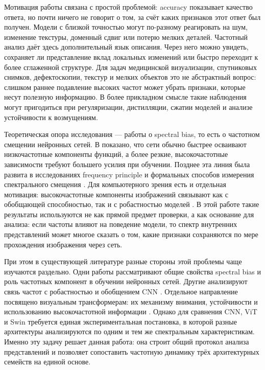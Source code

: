 Мотивация работы связана с простой проблемой: accuracy показывает качество ответа, но почти ничего не говорит о том, за счёт каких признаков этот ответ был получен. Модели с близкой точностью могут по-разному реагировать на шум, изменение текстуры, доменный сдвиг или потерю мелких деталей. Частотный анализ даёт здесь дополнительный язык описания. Через него можно увидеть, сохраняет ли представление вклад локальных изменений или быстро переходит к более сглаженной структуре. Для задач медицинской визуализации, спутниковых снимков, дефектоскопии, текстур и мелких объектов это не абстрактный вопрос: слишком раннее подавление высоких частот может убрать признаки, которые несут полезную информацию. В более прикладном смысле такие наблюдения могут пригодиться при регуляризации, дистилляции, сжатии моделей и анализе устойчивости к возмущениям.

Теоретическая опора исследования — работы о spectral bias, то есть о частотном смещении нейронных сетей. В \cite{rahaman2019spectral} показано, что сети обычно быстрее осваивают низкочастотные компоненты функций, а более резкие, высокочастотные зависимости требуют большего усилия при обучении. Позднее эта линия была развита в исследованиях frequency principle и формальных способов измерения спектрального смещения \cite{xu2025overview,kiessling2022computable}. Для компьютерного зрения есть и отдельная мотивация: высокочастотные компоненты изображений связывают как с обобщающей способностью, так и с робастностью моделей \cite{yin2019fourier,wang2020highfrequency}. В этой работе такие результаты используются не как прямой предмет проверки, а как основание для анализа: если частоты влияют на поведение модели, то спектр внутренних представлений может многое сказать о том, какие признаки сохраняются по мере прохождения изображения через сеть.

При этом в существующей литературе разные стороны этой проблемы чаще изучаются раздельно. Одни работы рассматривают общие свойства spectral bias и роль частотных компонент в обучении нейронных сетей. Другие анализируют связь частот с робастностью и обобщением CNN \cite{yin2019fourier,wang2020highfrequency}. Отдельное направление посвящено визуальным трансформерам: их механизму внимания, устойчивости и использованию высокочастотной информации \cite{park2022how,bai2022improving,naseer2021intriguing,paul2022vision}. Однако для сравнения CNN, ViT и Swin требуется единая экспериментальная постановка, в которой разные архитектуры анализируются по одним и тем же спектральным характеристикам. Именно эту задачу решает данная работа: она строит общий протокол анализа представлений и позволяет сопоставить частотную динамику трёх архитектурных семейств на единой основе.

